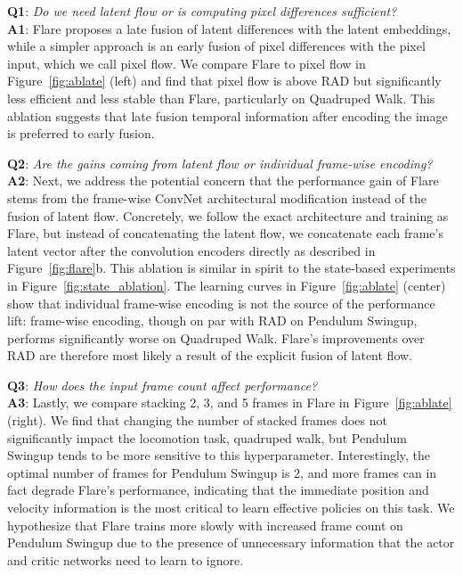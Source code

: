 \documentclass{article} \usepackage{iclr2021_conference,times}
\begin{document}
{\bf  Q1}: {\it Do we need latent flow or is computing pixel differences sufficient?} \\
{\bf A1}: Flare proposes a late fusion of latent differences with the latent embeddings, while a simpler approach is an early fusion of pixel differences with the pixel input, which we call pixel flow. We compare Flare to pixel flow in Figure~\ref{fig:ablate} (left) and find that pixel flow is above RAD but significantly less efficient and less stable than Flare, particularly on Quadruped Walk. This ablation suggests that late fusion temporal information after encoding the image is preferred to early fusion. 



{\bf  Q2}: {\it Are the gains coming from latent flow or individual frame-wise encoding?}\\ 
{\bf A2}: Next, we address the potential concern that the performance gain of Flare stems from the frame-wise ConvNet architectural modification instead of the fusion of latent flow. Concretely, we follow the exact architecture and training as Flare, but instead of concatenating the latent flow, we concatenate each frame's latent vector after the convolution encoders directly as described in Figure~\ref{fig:flare}b. This ablation is similar in spirit to the state-based experiments in Figure~\ref{fig:state_ablation}. The learning curves in Figure~\ref{fig:ablate} (center) show that individual frame-wise encoding is not the source of the performance lift: frame-wise encoding, though on par with RAD on Pendulum Swingup, performs significantly worse on Quadruped Walk. Flare's improvements over RAD are therefore most likely a result of the explicit fusion of latent flow.

{\bf  Q3}: {\it How does the input frame count affect performance?} \\
{\bf A3}: Lastly, we compare stacking 2, 3, and 5 frames in Flare in Figure~\ref{fig:ablate} (right). We find that changing the number of stacked frames does not significantly impact the locomotion task, quadruped walk, but Pendulum Swingup tends to be more sensitive to this hyperparameter. Interestingly, the optimal number of frames for Pendulum Swingup is 2, and more frames can in fact degrade Flare's performance, indicating that the immediate position and velocity information is the most critical to learn effective policies on this task. We hypothesize that Flare trains more slowly with increased frame count on Pendulum Swingup due to the presence of unnecessary information that the actor and critic networks need to learn to ignore.  
\end{document}
